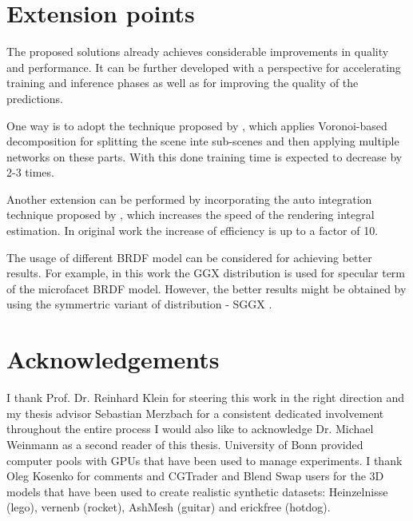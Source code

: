 

\section{Extension points}

The proposed solutions already achieves considerable improvements in quality and performance.
It can be further developed with a perspective for accelerating training and inference phases
as well as for improving the quality of the predictions.

One way is to adopt the technique proposed by \cite{rebain2020derf},
which applies Voronoi-based decomposition for splitting the scene inte sub-scenes
and then applying multiple networks on these parts.
With this done training time is expected to decrease by 2-3 times.

Another extension can be performed by incorporating the auto integration technique proposed by \cite{lindell2021autoint},
which increases the speed of the rendering integral estimation.
In original work the increase of efficiency is up to a factor of 10.

The usage of different BRDF model can be considered for achieving better results.
For example, in this work the GGX distribution \cite{walter2007microfacet}
is used for specular term of the microfacet BRDF model.
However, the better results might be obtained by using the symmertric variant of distribution - SGGX \cite{heitz2015sggx}.




\section{Acknowledgements}


I thank Prof. Dr. Reinhard Klein for steering this work in the right direction and my thesis advisor Sebastian Merzbach for a consistent dedicated involvement throughout the entire process
I would also like to acknowledge Dr. Michael Weinmann as a second reader of this thesis.
University of Bonn provided computer pools with GPUs that have been used to manage experiments.
I thank Oleg Kosenko for comments
and CGTrader and Blend Swap users for the 3D models
that have been used to create realistic synthetic datasets:
Heinzelnisse (lego), vernenb (rocket), AshMesh (guitar) and erickfree (hotdog).

